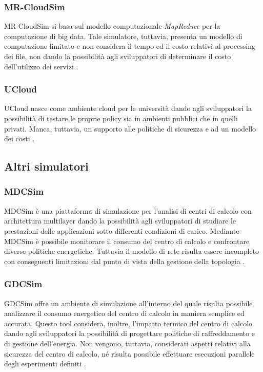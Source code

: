 {\subsubsection*{MR-CloudSim}
MR-CloudSim \cite{jung2012mr} si basa sul modello computazionale \emph{MapReduce} \cite{dean2008mapreduce} per la computazione di big data. Tale simulatore, tuttavia, presenta un modello di computazione limitato e non considera il tempo ed il costo relativi al processing dei file, non dando la possibilità agli sviluppatori di determinare il costo dell'utilizzo dei servizi \cite{mansouri2020cloud}. 
\subsubsection*{UCloud}
UCloud \cite{sqalli2012ucloud} nasce come ambiente cloud per le università dando agli sviluppatori la possibilità di testare le proprie policy sia in ambienti pubblici che in quelli privati. Manca, tuttavia, un supporto alle politiche di sicurezza e ad un modello dei costi \cite{mansouri2020cloud}.
\subsection{Altri simulatori}
\subsubsection*{MDCSim}
MDCSim \cite{lim2009mdcsim} è una piattaforma di simulazione per l'analisi di centri di calcolo con architettura multilayer dando la possibilità agli sviluppatori di studiare le prestazioni delle applicazioni sotto differenti condizioni di carico. Mediante MDCSim è possibile monitorare il consumo del centro di calcolo e confrontare diverse politiche energetiche. Tuttavia il modello di rete risulta essere incompleto con conseguenti limitazioni dal punto di vista della gestione della topologia \cite{mansouri2020cloud}. 
\subsubsection*{GDCSim}
GDCSim \cite{gupta2011gdcsim} offre un ambiente di simulazione all'interno del quale risulta possibile analizzare il consumo energetico del centro di calcolo in maniera semplice ed accurata. Questo tool considera, inoltre, l'impatto termico del centro di calcolo dando agli sviluppatori la possibilità di progettare politiche di raffreddamento e di gestione dell'energia. Non vengono, tuttavia, considerati aspetti relativi alla sicurezza del centro di calcolo, né risulta possibile effettuare esecuzioni parallele degli esperimenti definiti \cite{mansouri2020cloud}. 
}
